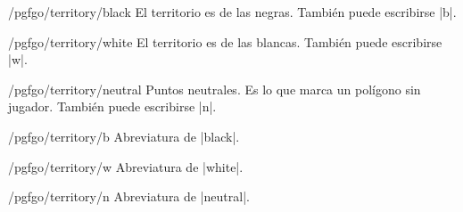 	\begin{key}{/pgfgo/territory/black}
		El territorio es de las negras. También puede escribirse |b|.
	\end{key}

	\begin{key}{/pgfgo/territory/white}
		El territorio es de las blancas. También puede escribirse |w|.
	\end{key}

	\begin{key}{/pgfgo/territory/neutral}
		Puntos neutrales. Es lo que marca un polígono sin jugador. También puede escribirse |n|.
	\end{key}

	\begin{key}{/pgfgo/territory/b}
		Abreviatura de |black|.
	\end{key}

	\begin{key}{/pgfgo/territory/w}
		Abreviatura de |white|.
	\end{key}

	\begin{key}{/pgfgo/territory/n}
		Abreviatura de |neutral|.
	\end{key}

